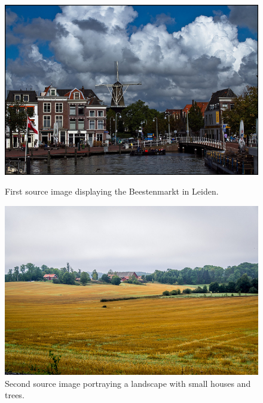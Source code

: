 \begin{figure}[H]
	\centering
	\includegraphics[width=1\linewidth]{img/beestemarkt.jpg}
	\caption{First source image displaying the Beestenmarkt in Leiden.\cite{imgbeestemarkt}}
	\label{fig:imgbeestemarkt}
	\endminipage\hfill
	\centering
	\includegraphics[width=1\linewidth]{img/landscape.jpg}
	\caption{Second source image portraying a landscape with small houses and trees.\cite{imglandscape}}
	\label{fig:imglandscape}
	\endminipage\hfill
\end{figure}